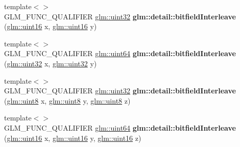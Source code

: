 \begin{DoxyCompactItemize}
\item 
\mbox{\label{bitfield_8inl_ac5f2b38221d4447775e88f1b003f8113}} 
{\footnotesize template$<$$>$ }\\G\+L\+M\+\_\+\+F\+U\+N\+C\+\_\+\+Q\+U\+A\+L\+I\+F\+I\+ER \hyperlink{group__gtc__type__precision_ga202b6a53c105fcb7e531f9b443518451}{glm\+::uint32} {\bfseries glm\+::detail\+::bitfield\+Interleave} (\hyperlink{group__gtc__type__precision_gad8c2939e1fdd8e5828b31d95c52255d5}{glm\+::uint16} x, \hyperlink{group__gtc__type__precision_gad8c2939e1fdd8e5828b31d95c52255d5}{glm\+::uint16} y)
\item 
\mbox{\label{bitfield_8inl_a7f40bc91b3d293fae0f7df8de85cdcc6}} 
{\footnotesize template$<$$>$ }\\G\+L\+M\+\_\+\+F\+U\+N\+C\+\_\+\+Q\+U\+A\+L\+I\+F\+I\+ER \hyperlink{group__gtc__type__precision_gae3632bf9b37da66233d78930dd06378a}{glm\+::uint64} {\bfseries glm\+::detail\+::bitfield\+Interleave} (\hyperlink{group__gtc__type__precision_ga202b6a53c105fcb7e531f9b443518451}{glm\+::uint32} x, \hyperlink{group__gtc__type__precision_ga202b6a53c105fcb7e531f9b443518451}{glm\+::uint32} y)
\item 
\mbox{\label{bitfield_8inl_a27e9c62ce3ad180236573daec6a6461f}} 
{\footnotesize template$<$$>$ }\\G\+L\+M\+\_\+\+F\+U\+N\+C\+\_\+\+Q\+U\+A\+L\+I\+F\+I\+ER \hyperlink{group__gtc__type__precision_ga202b6a53c105fcb7e531f9b443518451}{glm\+::uint32} {\bfseries glm\+::detail\+::bitfield\+Interleave} (\hyperlink{group__gtc__type__precision_ga1a7dcd8aac97cc8020817c94049deff2}{glm\+::uint8} x, \hyperlink{group__gtc__type__precision_ga1a7dcd8aac97cc8020817c94049deff2}{glm\+::uint8} y, \hyperlink{group__gtc__type__precision_ga1a7dcd8aac97cc8020817c94049deff2}{glm\+::uint8} z)
\item 
\mbox{\label{bitfield_8inl_aceed48a30e6dc4f2c64945a60369d73d}} 
{\footnotesize template$<$$>$ }\\G\+L\+M\+\_\+\+F\+U\+N\+C\+\_\+\+Q\+U\+A\+L\+I\+F\+I\+ER \hyperlink{group__gtc__type__precision_gae3632bf9b37da66233d78930dd06378a}{glm\+::uint64} {\bfseries glm\+::detail\+::bitfield\+Interleave} (\hyperlink{group__gtc__type__precision_gad8c2939e1fdd8e5828b31d95c52255d5}{glm\+::uint16} x, \hyperlink{group__gtc__type__precision_gad8c2939e1fdd8e5828b31d95c52255d5}{glm\+::uint16} y, \hyperlink{group__gtc__type__precision_gad8c2939e1fdd8e5828b31d95c52255d5}{glm\+::uint16} z)

\end{DoxyCompactItemize}
